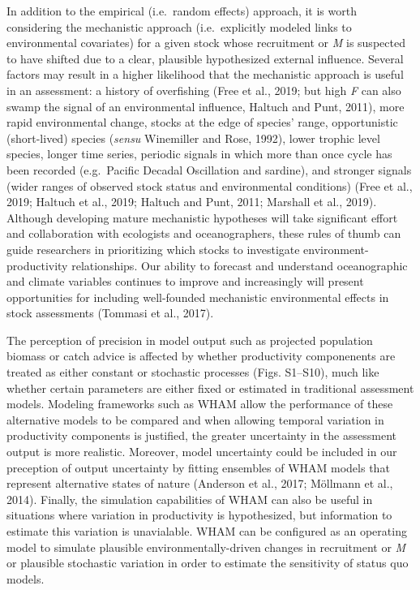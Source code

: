 \documentclass[]{article}
\begin{document}
In addition to the empirical (i.e.~random effects) approach, it is worth
considering the mechanistic approach (i.e.~explicitly modeled links to
environmental covariates) for a given stock whose recruitment or
\emph{M} is suspected to have shifted due to a clear, plausible
hypothesized external influence. Several factors may result in a higher
likelihood that the mechanistic approach is useful in an assessment: a
history of overfishing (Free et al., 2019; but high \emph{F} can also
swamp the signal of an environmental influence, Haltuch and Punt, 2011),
more rapid environmental change, stocks at the edge of species' range,
opportunistic (short-lived) species (\emph{sensu} Winemiller and Rose,
1992), lower trophic level species, longer time series, periodic signals
in which more than once cycle has been recorded (e.g.~Pacific Decadal
Oscillation and sardine), and stronger signals (wider ranges of observed
stock status and environmental conditions) (Free et al., 2019; Haltuch
et al., 2019; Haltuch and Punt, 2011; Marshall et al., 2019). Although
developing mature mechanistic hypotheses will take significant effort
and collaboration with ecologists and oceanographers, these rules of
thumb can guide researchers in prioritizing which stocks to investigate
environment-productivity relationships. Our ability to forecast and
understand oceanographic and climate variables continues to improve and
increasingly will present opportunities for including well-founded
mechanistic environmental effects in stock assessments (Tommasi et al.,
2017).

The perception of precision in model output such as projected population
biomass or catch advice is affected by whether productivity componenents
are treated as either constant or stochastic processes (Figs. S1--S10),
much like whether certain parameters are either fixed or estimated in
traditional assessment models. Modeling frameworks such as WHAM allow
the performance of these alternative models to be compared and when
allowing temporal variation in productivity components is justified, the
greater uncertainty in the assessment output is more realistic.
Moreover, model uncertainty could be included in our preception of
output uncertainty by fitting ensembles of WHAM models that represent
alternative states of nature (Anderson et al., 2017; Möllmann et al.,
2014). Finally, the simulation capabilities of WHAM can also be useful
in situations where variation in productivity is hypothesized, but
information to estimate this variation is unavialable. WHAM can be
configured as an operating model to simulate plausible
environmentally-driven changes in recruitment or \emph{M} or plausible
stochastic variation in order to estimate the sensitivity of status quo
models.
\end{document}
